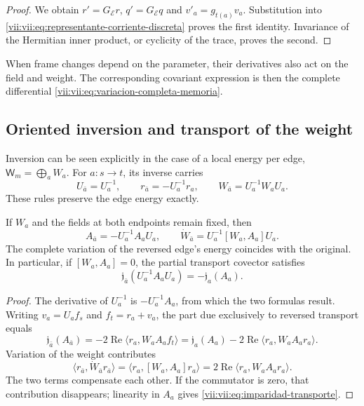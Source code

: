 \begin{proof}
We obtain \(r'=G_{\mathcal E}r\), \(q'=G_{\mathcal E}q\) and
\(v'_a=g_{t(a)}v_a\). Substitution into
\eqref{vii:vii:eq:representante-corriente-discreta} proves the first
identity. Invariance of the Hermitian inner product, or cyclicity of
the trace, proves the second.
\end{proof}

When frame changes depend on the parameter, their derivatives
also act on the field and weight. The corresponding covariant
expression is then the complete differential
\eqref{vii:vii:eq:variacion-completa-memoria}.

\subsection{Oriented inversion and transport of the weight}
\label{vii:vii:subsec:inversion-respuesta}

Inversion can be seen explicitly in the case of a local energy
per edge, \(\mathsf W_m=\bigoplus_a W_a\).
For \(a:s\to t\), its inverse carries
\[
 U_{\bar a}=U_a^{-1},\qquad
 r_{\bar a}=-U_a^{-1}r_a,\qquad
 W_{\bar a}=U_a^{-1}W_aU_a.
\]
These rules preserve the edge energy exactly.

\begin{proposition}
\label{vii:vii:prop:inversion-respuesta}
If \(W_a\) and the fields at both endpoints remain fixed, then
\[
 A_{\bar a}=-U_a^{-1}A_aU_a,\qquad
 \dot W_{\bar a}=U_a^{-1}[W_a,A_a]U_a.
\]
The complete variation of the reversed edge's energy coincides with
the original. In particular, if \([W_a,A_a]=0\), the partial transport
covector satisfies
\begin{equation}
 \mathfrak j_{\bar a}(U_a^{-1}A_aU_a)
 =-\mathfrak j_a(A_a).
 \label{vii:vii:eq:imparidad-transporte}
\end{equation}
\end{proposition}

\begin{proof}
The derivative of \(U_a^{-1}\) is \(-U_a^{-1}A_a\), from which
the two formulas result. Writing \(v_a=U_af_s\) and \(f_t=r_a+v_a\),
the part due exclusively to reversed transport equals
\[
 \mathfrak j_{\bar a}(A_{\bar a})
 =-2\operatorname{Re}\langle r_a,W_aA_af_t\rangle
 =\mathfrak j_a(A_a)
   -2\operatorname{Re}\langle r_a,W_aA_ar_a\rangle.
\]
Variation of the weight contributes
\[
 \langle r_{\bar a},\dot W_{\bar a}r_{\bar a}\rangle
 =\langle r_a,[W_a,A_a]r_a\rangle
 =2\operatorname{Re}\langle r_a,W_aA_ar_a\rangle.
\]
The two terms compensate each other. If the commutator is zero, that contribution
disappears; linearity in \(A_a\) gives
\eqref{vii:vii:eq:imparidad-transporte}.
\end{proof}


